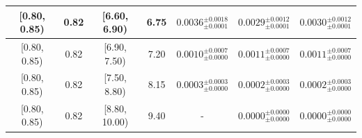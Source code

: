 \begin{longtable}{|c|c|c|c|c|c|c|}
\hline
[0.80, 0.85) & 0.82 & [6.60, 6.90) & 6.75 & $0.0036^{ \pm 0.0018 }_{ \pm 0.0001 }$ & $0.0029^{ \pm 0.0012 }_{ \pm 0.0001 }$ & $0.0030^{ \pm 0.0012 }_{ \pm 0.0001 }$ \\ 
\hline
[0.80, 0.85) & 0.82 & [6.90, 7.50) & 7.20 & $0.0010^{ \pm 0.0007 }_{ \pm 0.0000 }$ & $0.0011^{ \pm 0.0007 }_{ \pm 0.0000 }$ & $0.0011^{ \pm 0.0007 }_{ \pm 0.0000 }$ \\ 
\hline
[0.80, 0.85) & 0.82 & [7.50, 8.80) & 8.15 & $0.0003^{ \pm 0.0003 }_{ \pm 0.0000 }$ & $0.0002^{ \pm 0.0003 }_{ \pm 0.0000 }$ & $0.0002^{ \pm 0.0003 }_{ \pm 0.0000 }$ \\ 
\hline
[0.80, 0.85) & 0.82 & [8.80, 10.00) & 9.40 & - & $0.0000^{ \pm 0.0000 }_{ \pm 0.0000 }$ & $0.0000^{ \pm 0.0000 }_{ \pm 0.0000 }$ \\ 
\hline
\end{longtable}
\endgroup
